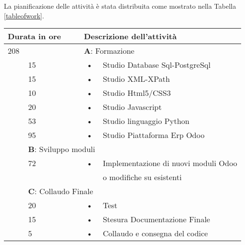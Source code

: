 \newpage
La pianificazione delle attività è stata distribuita come mostrato nella Tabella \ref{tableofwork}.
\begin{center}
	\begin{tabular}{|l|l|c l|}
		\hline
		\multicolumn{2}{|l|}{\textbf{Durata in ore}}		&	\multicolumn{2}{l|}{\textbf{Descrizione dell'attività}}\\
		\hline
		\multicolumn{2}{|l|}{208}	&	\multicolumn{2}{l|}{\textbf{A}: Formazione}\\
		\hline
		\multirow{5}{1cm}{ } & 15  & \hspace{5mm}•\hspace{2mm} & Studio Database Sql-PostgreSql \\
		\multirow{5}{1cm}{ } & 15 & \hspace{5mm}•\hspace{2mm} & Studio XML-XPath                 \\
		\multirow{5}{1cm}{ } & 10 & \hspace{5mm}•\hspace{2mm} & Studio Html5/CSS3\\
		\multirow{5}{1cm}{ } & 20 & \hspace{5mm}•\hspace{2mm} & Studio Javascript\\
		\multirow{5}{1cm}{ } & 53 & \hspace{5mm}•\hspace{2mm} & Studio linguaggio Python\\
		\multirow{5}{1cm}{ } & 95 & \hspace{5mm}•\hspace{2mm} & Studio Piattaforma Erp Odoo\\
		\hline																											
		\multicolumn{2}{|l|}{72}	&	\multicolumn{2}{l|}{\textbf{B}: Sviluppo moduli}\\
		\hline
		\multirow{5}{1cm}{ } & 72  & \hspace{5mm}•\hspace{2mm} & Implementazione di nuovi moduli Odoo  \\ & & & o modifiche su esistenti\\
		
		\hline
																											
		\multicolumn{2}{|l|}{40}	&	\multicolumn{2}{l|}{\textbf{C}: Collaudo Finale}\\
		\hline
		\multirow{5}{1cm}{ } & 20  & \hspace{5mm}•\hspace{2mm} & Test\\
		\multirow{5}{1cm}{ } & 15 & \hspace{5mm}•\hspace{2mm} & Stesura Documentazione Finale \\
		\multirow{5}{1cm}{ } & 5 & \hspace{5mm}•\hspace{2mm} & Collaudo e consegna del codice\\


\end{tabular}
\end{center}
